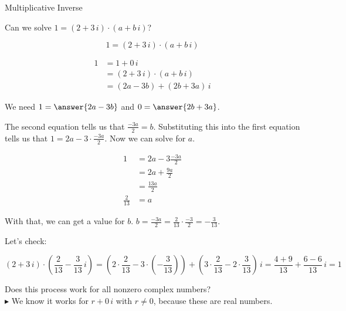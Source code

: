 \documentclass{ximera}
\begin{document}
\begin{example} Multiplicative Inverse


Can we solve $1 = (2 + 3 \, i) \cdot (a + b \, i)  $?


\begin{explanation}

\[   1 = (2 + 3 \, i) \cdot (a + b \, i)       \]



\begin{align*}
1     & = 1 + 0 \, i  \\
      & =    (2 + 3 \, i) \cdot (a + b \, i)   \\
      & =    (2a - 3b) + (2b+3a) \, i   
\end{align*}


We need $1 = \answer{2a - 3b}$ and $0 = \answer{2b+3a}$.


The second  equation tells us that $\frac{-3a}{2} = b$.  Substituting this into the first equation tells us that $1 = 2a - 3 \cdot \frac{-3a}{2}$.  Now we can solve for $a$.



\begin{align*}
1     & = 2a - 3\frac{-3a}{2}  \\
      & =   2a + \frac{9a}{2}   \\
      & =    \frac{13a}{2}   \\
  \frac{2}{13}    & =  a
\end{align*}




With that, we can get a value for $b$.   $ b = \frac{-3a}{2} = \frac{2}{13}  \cdot \frac{-3}{2} = -\frac{3}{13}$.

Let's check:



\[    (2 + 3 \, i) \cdot (\frac{2}{13} - \frac{3}{13} \, i)     =   \left( 2 \cdot  \frac{2}{13} - 3 \cdot \left(- \frac{3}{13}\right)\right)  + \left( 3 \cdot \frac{2}{13} - 2 \cdot \frac{3}{13} \right) \, i = \frac{4+9}{13} + \frac{6-6}{13} \, i = 1  \]



\end{explanation}



\end{example}


Does this process work for all nonzero complex numbers? \\


$\blacktriangleright$  We know it works for $r + 0 \, i$ with $r \ne 0$, because these are real numbers.
\end{document}

